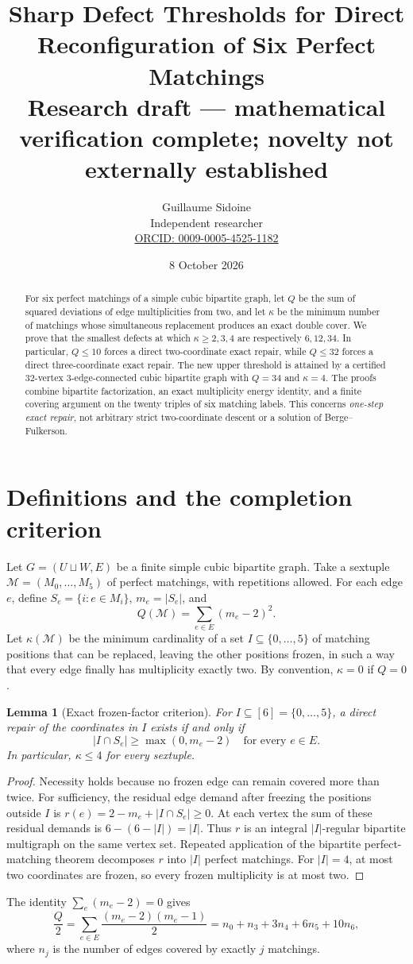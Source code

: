\documentclass[11pt]{article}
\title{Sharp Defect Thresholds for Direct Reconfiguration of Six Perfect Matchings\\\large Research draft --- mathematical verification complete; novelty not externally established}
\author{Guillaume Sidoine\\Independent researcher\\\href{https://orcid.org/0009-0005-4525-1182}{ORCID: 0009-0005-4525-1182}}
\date{8 October 2026}
\newtheorem{lemma}[theorem]{Lemma}
\newcommand{\kk}{\kappa}
\begin{document}
\maketitle
\begin{abstract}
For six perfect matchings of a simple cubic bipartite graph, let $Q$ be the sum of squared deviations of edge multiplicities from two, and let $\kk$ be the minimum number of matchings whose simultaneous replacement produces an exact double cover. We prove that the smallest defects at which $\kk\ge2,3,4$ are respectively $6,12,34$. In particular, $Q\le10$ forces a direct two-coordinate exact repair, while $Q\le32$ forces a direct three-coordinate exact repair. The new upper threshold is attained by a certified $32$-vertex $3$-edge-connected cubic bipartite graph with $Q=34$ and $\kk=4$. The proofs combine bipartite factorization, an exact multiplicity energy identity, and a finite covering argument on the twenty triples of six matching labels. This concerns \emph{one-step exact repair}, not arbitrary strict two-coordinate descent or a solution of Berge--Fulkerson.
\end{abstract}

\section{Definitions and the completion criterion}
Let $G=(U\sqcup W,E)$ be a finite simple cubic bipartite graph. Take a sextuple $\mathcal M=(M_0,\dots,M_5)$ of perfect matchings, with repetitions allowed. For each edge $e$, define $S_e=\{i:e\in M_i\}$, $m_e=|S_e|$, and
\[
Q(\mathcal M)=\sum_{e\in E}(m_e-2)^2.
\]
Let $\kk(\mathcal M)$ be the minimum cardinality of a set $I\subseteq\{0,\dots,5\}$ of matching positions that can be replaced, leaving the other positions frozen, in such a way that every edge finally has multiplicity exactly two. By convention, $\kk=0$ if $Q=0$.

\begin{lemma}[Exact frozen-factor criterion]\label{lem:criterion}
For $I\subseteq[6]=\{0,\dots,5\}$, a direct repair of the coordinates in $I$ exists if and only if
\[
|I\cap S_e|\ge \max(0,m_e-2)\quad\text{for every }e\in E.
\tag{1}\label{eq:criterion}
\]
In particular, $\kk\le4$ for every sextuple.
\end{lemma}
\begin{proof}
Necessity holds because no frozen edge can remain covered more than twice. For sufficiency, the residual edge demand after freezing the positions outside $I$ is $r(e)=2-m_e+|I\cap S_e|\ge0$. At each vertex the sum of these residual demands is $6-(6-|I|)=|I|$. Thus $r$ is an integral $|I|$-regular bipartite multigraph on the same vertex set. Repeated application of the bipartite perfect-matching theorem decomposes $r$ into $|I|$ perfect matchings. For $|I|=4$, at most two coordinates are frozen, so every frozen multiplicity is at most two.
\end{proof}
The identity $\sum_e(m_e-2)=0$ gives
\begin{equation}\label{eq:energy}
\frac{Q}{2}=\sum_{e\in E}\frac{(m_e-2)(m_e-1)}2
=n_0+n_3+3n_4+6n_5+10n_6,
\end{equation}
where $n_j$ is the number of edges covered by exactly $j$ matchings.
\end{document}
